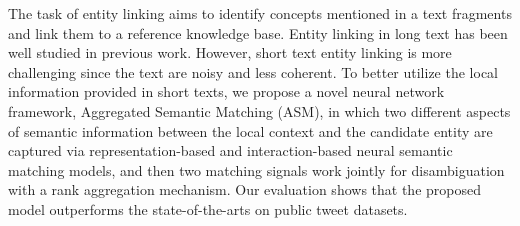 The task of entity linking aims to identify concepts mentioned in a text fragments and link them to a reference knowledge base. Entity linking in long text has been well studied in previous work. However, short text entity linking is more challenging since the text are noisy and less coherent. To better utilize the local information provided in short texts, we propose a novel neural network framework, Aggregated Semantic Matching (ASM), in which two different aspects of semantic information between the local context and the candidate entity are captured via representation-based and interaction-based neural semantic matching models, and then two matching signals work jointly for disambiguation with a rank aggregation mechanism. Our evaluation shows that the proposed model outperforms the state-of-the-arts on public tweet datasets.
